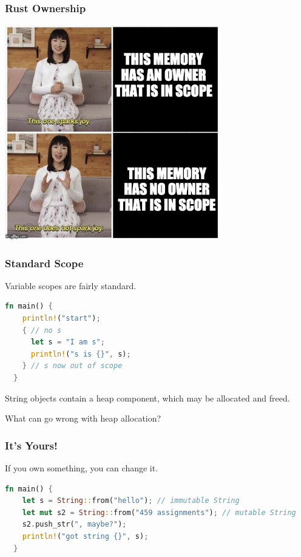 \begin{frame}
\frametitle{Rust Ownership}

\begin{center}
	\includegraphics[width=0.7\textwidth]{images/joy.jpeg}
\end{center}

\end{frame}



\begin{frame}[fragile]
\frametitle{Standard Scope}

Variable scopes are fairly standard.
\begin{lstlisting}[language=Rust]
  fn main() {
    println!("start");
    { // no s
      let s = "I am s";
      println!("s is {}", s);
    } // s now out of scope
  }
\end{lstlisting}

 String objects contain a heap component,
which may be allocated and freed.

What can go wrong with heap allocation?

\end{frame}


\begin{frame}[fragile]
\frametitle{It's Yours!}

If you own something, you can change it.

\begin{lstlisting}[language=Rust]
  fn main() {
    let s = String::from("hello"); // immutable String
    let mut s2 = String::from("459 assignments"); // mutable String
    s2.push_str(", maybe?");
    println!("got string {}", s);
  }
\end{lstlisting}

\end{frame}


